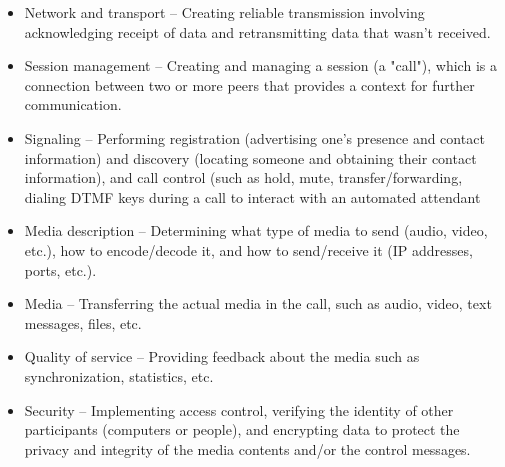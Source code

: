\documentclass[a4paper,12pt]{book}
\begin{document}
\begin{itemize}
\item{Network and transport – Creating reliable transmission involving acknowledging receipt of data and retransmitting data that wasn't received.}
\item{Session management – Creating and managing a session (a "call"), which is a connection between two or more peers that provides a context for further communication.}
\item{Signaling – Performing registration (advertising one's presence and contact information) and discovery (locating someone and obtaining their contact information), and call control (such as hold, mute, transfer/forwarding, dialing DTMF keys during a call to interact with an automated attendant}
\item{Media description – Determining what type of media to send (audio, video, etc.), how to encode/decode it, and how to send/receive it (IP addresses, ports, etc.).}
\item{Media – Transferring the actual media in the call, such as audio, video, text messages, files, etc.}
\item{Quality of service – Providing feedback about the media such as synchronization, statistics, etc.}
\item{Security – Implementing access control, verifying the identity of other participants (computers or people), and encrypting data to protect the privacy and integrity of the media contents and/or the control messages.}
\end{itemize}
\end{document}
